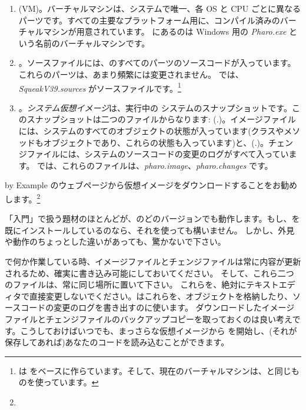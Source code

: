 \documentclass[a4paper,10pt,twoside]{book}
\begin{document}
\begin{enumerate}

  \item {} (VM)。バーチャルマシンは、システムで唯一、各 OS と CPU ごとに異なるパーツです。すべての主要なプラットフォーム用に、コンパイル済みのバーチャルマシンが用意されています。 にあるのは Windows 用の \textit{Pharo.exe} という名前のバーチャルマシンです。

  \item {}。ソースファイルには、\pharo のすべてのパーツのソースコードが入っています。これらのパーツは、あまり頻繁には変更されません。 では、\emph{SqueakV39.sources} がソースファイルです。\footnote{\pharo は  をベースに作らています。そして、現在のバーチャルマシンは、\squeak と同じものを使っています。}

  \item {}。\emph{システム仮想イメージ}は、実行中の \pharo システムのスナップショットです。このスナップショットは二つのファイルからなります: (.)。イメージファイルには、システムのすべてのオブジェクトの状態が入っています(クラスやメソッドもオブジェクトであり、これらの状態も入っています)と、(.)。チェンジファイルには、システムのソースコードの変更のログがすべて入っています。
 では、これらのファイルは、\emph{pharo.image}、\emph{pharo.changes} です。
\end{enumerate}

\pharo by Example のウェブページから仮想イメージをダウンロードすることをお勧めします。\footnote{\pbe}

「入門」で扱う題材のほとんどが、\pharo のどのバージョンでも動作します。もし、\pharo を既にインストールしているのなら、それを使っても構いません。
しかし、外見や動作のちょっとした違いがあっても、驚かないで下さい。

\pharo で何か作業している時、イメージファイルとチェンジファイルは常に内容が更新されるため、確実に書き込み可能にしておいてください。
そして、これら二つのファイルは、常に同じ場所に置いて下さい。
これらを、絶対にテキストエディタで直接変更しないでください。\pharo はこれらを、オブジェクトを格納したり、ソースコードの変更のログを書き出すのに使います。
ダウンロードしたイメージファイルとチェンジファイルのバックアップコピーを取っておくのは良い考えです。こうしておけばいつでも、まっさらな仮想イメージから \pharo を開始し、(それが保存してあれば)あなたのコードを読み込むことができます。
\end{document}
